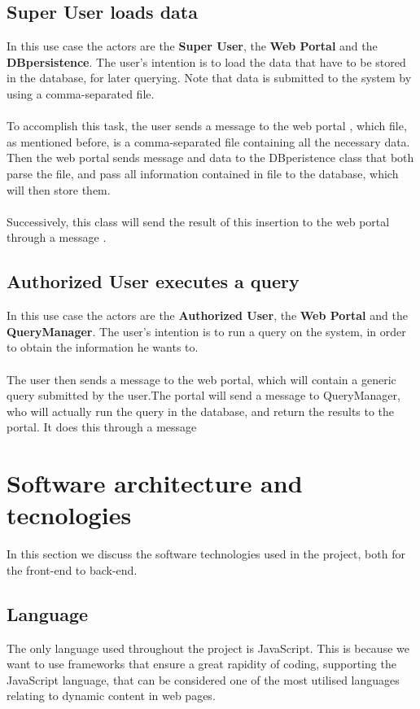 \subsection{Super User loads data}
In this use case the actors are the \textbf{Super User}, the \textbf{Web Portal} and the \textbf{DBpersistence}. The user's intention is to load the data that have to be stored in the database, for later querying. Note that data is submitted to the system by using a comma-separated file. \\
\\To accomplish this task, the user sends a message to the web portal , which file, as mentioned before, is a comma-separated file containing all the necessary data. Then the web portal sends message and data to the DBperistence class that both parse the file, and pass all information contained in file to the database, which will then store them. \\
\\Successively, this class will send the result of this insertion to the web portal through a message .

\subsection{Authorized User executes a query}
In this use case the actors are the \textbf{Authorized User}, the \textbf{Web Portal} and the \textbf{QueryManager}. 
The user's intention is to run a query on the system, in order to obtain the information he wants to.\\
\\The user then sends a message  to the web portal, which will contain a generic query submitted by the user.The portal will send a message  to QueryManager, who will actually run the query in the database, and return the results to the portal. It does this through a message 

\section{Software architecture and tecnologies}
In this section we discuss the software technologies used in the project, both for the front-end to back-end.
\subsection{Language}
The only language used throughout the project is JavaScript. This is because we want to use frameworks that ensure a great rapidity of coding, supporting the JavaScript language, that can be considered one of the most utilised languages relating to dynamic content in web pages.
